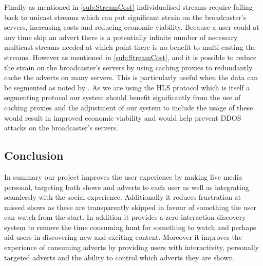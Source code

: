 	Finally as mentioned in \ref{sub:StreamCost} individualised streams require falling back to unicast streams which can put significant strain on the broadcaster's servers, increasing costs and reducing economic viability. Because a user could at any time skip an advert there is a potentially infinite number of necessary multicast streams needed at which point there is no benefit to multi-casting the streams. However as mentioned in \ref{sub:StreamCost}, \citet{segmentProxyCaching} and \citet{cachedStream} it is possible to reduce the strain on the broadcaster's servers by using caching proxies to redundantly cache the adverts on many servers. This is particularly useful when the data can be segmented as noted by \citet{segmentProxyCaching}. As we are using the HLS protocol \citet{HLS} which is itself a segmenting protocol our system should benefit significantly from the use of caching proxies and the adjustment of our system to include the usage of these would result in improved economic viability and would help prevent DDOS attacks on the broadcaster's servers.

	\subsection{Conclusion}
In summary our project improves the user experience by making live media personal, targeting both shows and adverts to each user as well as integrating seamlessly with the social experience. Additionally it reduces frustration at missed shows as these are transparently skipped in favour of something the user can watch from the start. In addition it provides a zero-interaction discovery system to remove the time consuming hunt for something to watch and perhaps aid users in discovering new and exciting content. Moreover it improves the experience of consuming adverts by providing users with interactivity, personally targeted adverts and the ability to control which adverts they are shown. 
